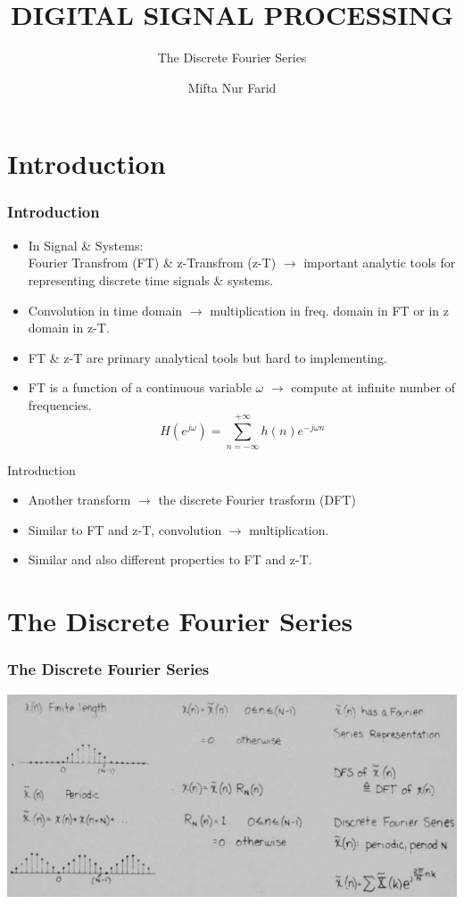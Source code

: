 \documentclass[pdflatex,compress,mathserif]{beamer}
\title{DIGITAL SIGNAL PROCESSING}
\subtitle{The Discrete Fourier Series}
\author{Mifta Nur Farid}
\begin{document}
\maketitle

\section{Introduction}

\begin{frame}
	\frametitle{Introduction}
	\begin{itemize}
		\item In Signal \& Systems:\\
		Fourier Transfrom (FT) \& z-Transfrom (z-T) $\rightarrow$ important analytic tools for representing discrete time signals \& systems.
		\item Convolution in time domain $\rightarrow$ multiplication in freq. domain in FT or in z domain in z-T.
		\item FT \& z-T are primary analytical tools but hard to implementing.
		\item FT is a function of a continuous variable $\omega$ $\rightarrow$ compute at infinite number of frequencies. $$ H(e^{j\omega}) = \sum\limits_{n=-\infty}^{+\infty} h(n)e^{-j \omega n} $$
	\end{itemize}
\end{frame}

\begin{frame}{Introduction}
	\begin{itemize}
		\item Another transform $\rightarrow$ the discrete Fourier trasform (DFT)
		\item Similar to FT and z-T, convolution $\rightarrow$ multiplication.
		\item Similar and also different properties to FT and z-T.
	\end{itemize}
\end{frame}

\section{The Discrete Fourier Series}

\begin{frame}
	\frametitle{The Discrete Fourier Series}
	\begin{center}
		\includegraphics[width=\linewidth]{img/img01}
	\end{center}
\end{frame}
\end{document}
